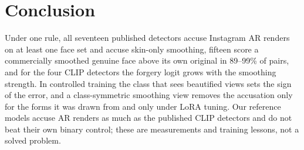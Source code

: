\documentclass[conference]{IEEEtran}
\begin{document}
\section{Conclusion}
Under one rule, all seventeen published detectors accuse Instagram AR renders on at least one face set and accuse skin-only
smoothing, fifteen score a commercially smoothed genuine face above its own original in 89--99\% of pairs, and for the four CLIP
detectors the forgery logit grows with the smoothing strength. In controlled training the class that sees beautified views sets
the sign of the error, and a class-symmetric smoothing view removes the accusation only for the forms it was drawn from and only
under LoRA tuning. Our reference models accuse AR renders as much as the published CLIP detectors and do not beat their own binary
control; these are measurements and training lessons, not a solved problem.



\end{document}
